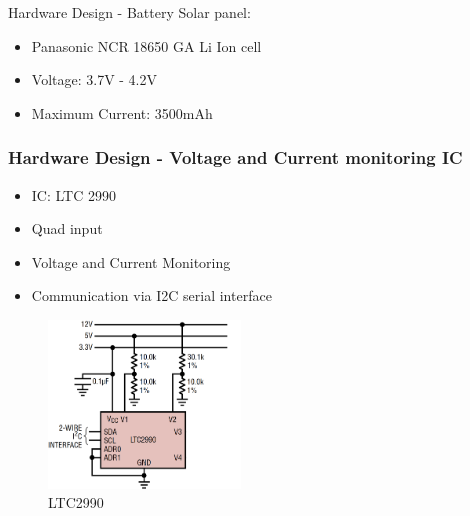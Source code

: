 \documentclass[aspectratio=169]{beamer}
\begin{document}
		\begin{frame}{Hardware Design - Battery}
		Solar panel:
		\begin{itemize}
			\item Panasonic NCR 18650 GA Li Ion cell
			\item Voltage: 3.7V - 4.2V
			\item Maximum Current: 3500mAh

		\end{itemize}
	\end{frame}
	
%	
%		
%	
	
		
	\begin{frame}
		\frametitle{Hardware Design - Voltage and Current monitoring IC}
		
		\begin{minipage}{0.5\textwidth}
		\begin{itemize}
	\item IC: LTC 2990
	\item Quad input
	\item Voltage and Current Monitoring
	\item Communication via I2C serial interface
\end{itemize}
		\end{minipage}
		\begin{minipage}{0.3\textwidth}
			\begin{figure}
				\includegraphics[width=5.1cm]{diag/sense.png}
				\begin{center}
					\caption{LTC2990}
				\end{center}
				\label{fig:trac2}
				
			\end{figure}
			
		\end{minipage}
		
	\end{frame}
	
\end{document}
